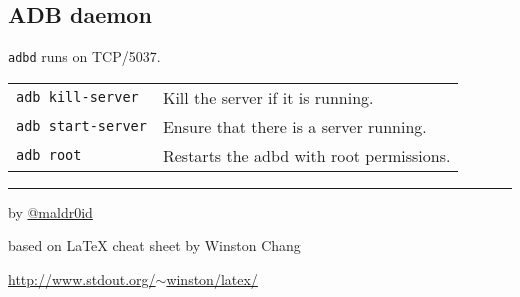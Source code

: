 \documentclass[11pt,landscape,a4paper]{article}
\begin{document}
\begin{multicols}{3}
\subsection{ADB daemon}
\texttt{adbd} runs on TCP/5037.

\vspace*{1mm}

\begin{tabular}{@{}ll@{}}

\texttt{adb kill-server}  & Kill the server if it is running.\\
\texttt{adb start-server} & Ensure that there is a server running.\\
\texttt{adb root} & Restarts the adbd with root permissions.\\
\end{tabular}

\rule{0.3\linewidth}{0.25pt}
\scriptsize

by \href{http://www.twitter.com/maldr0id}{@maldr0id}

based on \LaTeX{} cheat sheet by Winston Chang

\href{http://www.stdout.org/~winston/latex/}{http://www.stdout.org/$\sim$winston/latex/}


\end{multicols}
\end{document}
